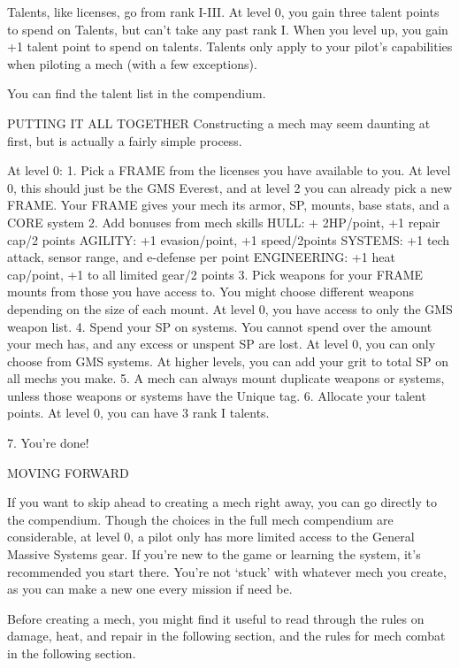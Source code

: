 Talents, like licenses, go from rank I-III. At level 0, you gain three talent points to spend on  
Talents, but can’t take any past rank I. When you level up, you gain +1 talent point to spend on  
talents. Talents only apply to your pilot’s capabilities when piloting a mech (with a few  
exceptions).
 

You can find the talent list in the compendium.
 

                                   PUTTING IT ALL TOGETHER  
Constructing a mech may seem daunting at first, but is actually a fairly simple process.  

At level 0:  
     1.  Pick a FRAME from the licenses you have available to you. At level 0, this should just be  
         the GMS Everest, and at level 2 you can already pick a new FRAME. Your FRAME gives  
         your mech its armor, SP, mounts, base stats, and a CORE system  
    2.   Add bonuses from mech skills  
                 HULL: + 2HP/point, +1 repair cap/2 points  
                 AGILITY: +1 evasion/point, +1 speed/2points  
                 SYSTEMS: +1 tech attack, sensor range, and e-defense per point  
                 ENGINEERING: +1 heat cap/point, +1 to all limited gear/2 points  
    3.   Pick weapons for your FRAME mounts from those you have access to. You might choose  
         different weapons depending on the size of each mount. At level 0, you have access to  
         only the GMS weapon list.  
    4.   Spend your SP on systems. You cannot spend over the amount your mech has, and any  
         excess or unspent SP are lost. At level 0, you can only choose from GMS systems. At  
         higher levels, you can add your grit to total SP on all mechs you make.  
    5.   A mech can always mount duplicate weapons or systems, unless those weapons or  
         systems have the Unique tag.  
    6.   Allocate your talent points. At level 0, you can have 3 rank I talents.
 
    7.   You’re done!
 

                                                                                                                


                                             MOVING FORWARD  

If you want to skip ahead to creating a mech right away, you can go directly to the compendium.  
Though the choices in the full mech compendium are considerable, at level 0, a pilot only has  
more limited access to the General Massive Systems gear. If you’re new to the game or learning  
the system, it’s recommended you start there. You’re not ‘stuck’ with whatever mech you create,  
as you can make a new one every mission if need be.  

Before creating a mech, you might find it useful to read through the rules on damage, heat, and  
repair in the following section, and the rules for mech combat in the following section.
 

                                                                                                                 

